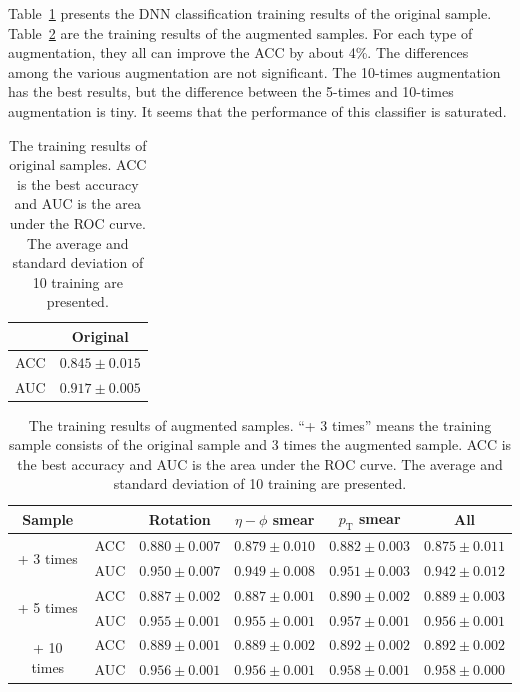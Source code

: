 \documentclass[12pt]{article}
\begin{document}
        Table~\ref{tab:original_sample_training_results} presents the DNN classification training results of the original sample. Table~\ref{tab:augmentation_sample_training_results} are the training results of the augmented samples. For each type of augmentation, they all can improve the ACC by about 4\%. The differences among the various augmentation are not significant. The 10-times augmentation has the best results, but the difference between the 5-times and 10-times augmentation is tiny. It seems that the performance of this classifier is saturated.
        \begin{table}[htpb]
            \centering
            \caption{The training results of original samples. ACC is the best accuracy and AUC is the area under the ROC curve. The average and standard deviation of 10 training are presented.}
            \label{tab:original_sample_training_results}
            \begin{tabular}{c|c}
                & Original \\ \hline
            ACC & $0.845 \pm 0.015$    \\
            AUC & $0.917 \pm 0.005$    
            \end{tabular}
        \end{table}
        \begin{table}[htpb]
            \centering
            \caption{The training results of augmented samples. ``+ 3 times'' means the training sample consists of the original sample and 3 times the augmented sample. ACC is the best accuracy and AUC is the area under the ROC curve. The average and standard deviation of 10 training are presented.}
            \label{tab:augmentation_sample_training_results}
            \begin{tabular}{c|c|cccc}
                Sample                      &     & Rotation          & $\eta-\phi$ smear & $p_{\text{T}}$ smear & All               \\ \hline
                \multirow{2}{*}{+ 3 times}  & ACC & $0.880 \pm 0.007$ & $0.879 \pm 0.010$ & $0.882 \pm 0.003$    & $0.875 \pm 0.011$ \\
                                            & AUC & $0.950 \pm 0.007$ & $0.949 \pm 0.008$ & $0.951 \pm 0.003$    & $0.942 \pm 0.012$ \\ \hline
                \multirow{2}{*}{+ 5 times}  & ACC & $0.887 \pm 0.002$ & $0.887 \pm 0.001$ & $0.890 \pm 0.002$    & $0.889 \pm 0.003$ \\
                                            & AUC & $0.955 \pm 0.001$ & $0.955 \pm 0.001$ & $0.957 \pm 0.001$    & $0.956 \pm 0.001$ \\ \hline
                \multirow{2}{*}{+ 10 times} & ACC & $0.889 \pm 0.001$ & $0.889 \pm 0.002$ & $0.892 \pm 0.002$    & $0.892 \pm 0.002$ \\
                                            & AUC & $0.956 \pm 0.001$ & $0.956 \pm 0.001$ & $0.958 \pm 0.001$    & $0.958 \pm 0.000$
            \end{tabular}
        \end{table} 
        
\end{document}
